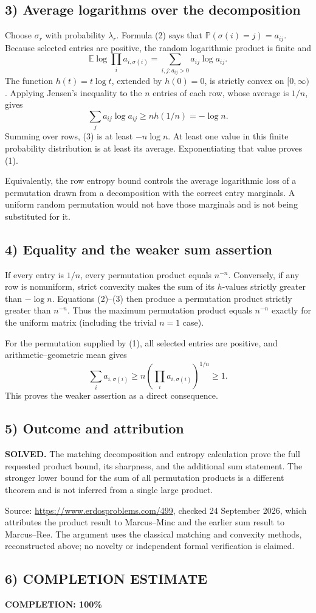 \subsection*{3) Average logarithms over the decomposition}
Choose $\sigma_r$ with probability $\lambda_r$. Formula (2) says that $\mathbb P(\sigma(i)=j)=a_{ij}$. Because selected entries are positive, the random logarithmic product is finite and
\[\mathbb E\log\prod_i a_{i,\sigma(i)}
=\sum_{i,j:a_{ij}>0}a_{ij}\log a_{ij}.\tag{3}\]
The function $h(t)=t\log t$, extended by $h(0)=0$, is strictly convex on $[0,\infty)$. Applying Jensen's inequality to the $n$ entries of each row, whose average is $1/n$, gives
\[\sum_j a_{ij}\log a_{ij}\ge n h(1/n)=-\log n.
\]
Summing over rows, (3) is at least $-n\log n$. At least one value in this finite probability distribution is at least its average. Exponentiating that value proves (1).

Equivalently, the row entropy bound controls the average logarithmic loss of a permutation drawn from a decomposition with the correct entry marginals. A uniform random permutation would not have those marginals and is not being substituted for it.

\subsection*{4) Equality and the weaker sum assertion}
If every entry is $1/n$, every permutation product equals $n^{-n}$. Conversely, if any row is nonuniform, strict convexity makes the sum of its $h$-values strictly greater than $-\log n$. Equations (2)--(3) then produce a permutation product strictly greater than $n^{-n}$. Thus the maximum permutation product equals $n^{-n}$ exactly for the uniform matrix (including the trivial $n=1$ case).

For the permutation supplied by (1), all selected entries are positive, and arithmetic--geometric mean gives
\[\sum_i a_{i,\sigma(i)}
\ge n\left(\prod_i a_{i,\sigma(i)}\right)^{1/n}\ge1.
\]
This proves the weaker assertion as a direct consequence.

\subsection*{5) Outcome and attribution}
\textbf{SOLVED.} The matching decomposition and entropy calculation prove the full requested product bound, its sharpness, and the additional sum statement. The stronger lower bound for the sum of all permutation products is a different theorem and is not inferred from a single large product.

Source: \url{https://www.erdosproblems.com/499}, checked 24 September 2026, which attributes the product result to Marcus--Minc and the earlier sum result to Marcus--Ree. The argument uses the classical matching and convexity methods, reconstructed above; no novelty or independent formal verification is claimed.

\subsection*{6) COMPLETION ESTIMATE}
\textbf{COMPLETION: 100\%}
